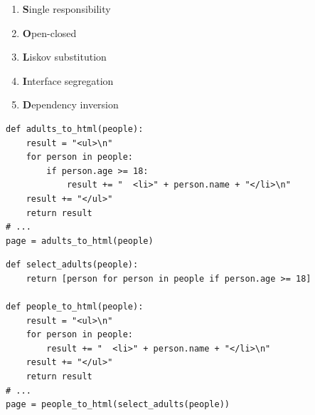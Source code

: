 \documentclass[calcdimensions,landscape,letterpaper]{powersem}
\newcommand{\thecurrentheading}{}
\newcommand{\heading}[1]{\renewcommand{\thecurrentheading}{#1}}
\begin{document}
\begin{slide}
  \heading{The SOLID Principles}
  \begin{center}
    \begin{Large}
      \begin{minipage}[c]{.6\textwidth}
        \begin{enumerate}
          \item \textbf{S}ingle responsibility
          \item \textbf{O}pen-closed
          \item \textbf{L}iskov substitution
          \item \textbf{I}nterface segregation
          \item \textbf{D}ependency inversion
        \end{enumerate}
      \end{minipage}
    \end{Large}
  \end{center}
\end{slide}

\begin{slide}
  \heading{Single Responsibility - Before}
  \begin{center}
    \begin{verbatim}
def adults_to_html(people):
    result = "<ul>\n"
    for person in people:
        if person.age >= 18:
            result += "  <li>" + person.name + "</li>\n"
    result += "</ul>"
    return result
# ...
page = adults_to_html(people)
    \end{verbatim}
  \end{center}
\end{slide}

\begin{slide}
  \heading{Single Responsibility - After}
  \begin{center}
    \begin{verbatim}
def select_adults(people):
    return [person for person in people if person.age >= 18]

def people_to_html(people):
    result = "<ul>\n"
    for person in people:
        result += "  <li>" + person.name + "</li>\n"
    result += "</ul>"
    return result
# ...
page = people_to_html(select_adults(people))
    \end{verbatim}
  \end{center}
\end{slide}
\end{document}
